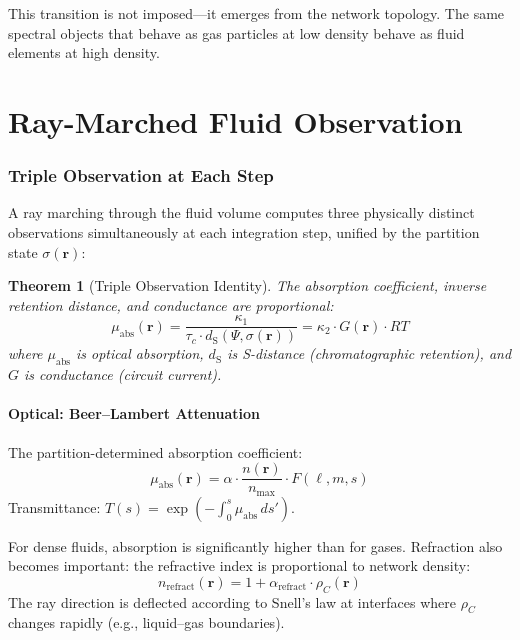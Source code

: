 \documentclass[twocolumn,10pt,a4paper]{article}
\theoremstyle{plain}
\newtheorem{theorem}{Theorem}[section]
\theoremstyle{definition}
\theoremstyle{remark}
\newcommand{\tauc}{\tau_c}
\newcommand{\dS}{d_{\mathrm{S}}}
\begin{document}
This transition is not imposed---it emerges from the network topology. The same spectral objects that behave as gas particles at low density behave as fluid elements at high density.


\part{Ray-Marched Fluid Observation}
\label{part:ray_march}

\section{Triple Observation at Each Step}
\label{sec:triple_obs}

A ray marching through the fluid volume computes three physically distinct observations simultaneously at each integration step, unified by the partition state $\sigma(\mathbf{r})$:

\begin{theorem}[Triple Observation Identity]
\label{thm:triple_obs}
The absorption coefficient, inverse retention distance, and conductance are proportional:
\begin{equation}
\boxed{\mu_{\mathrm{abs}}(\mathbf{r}) = \frac{\kappa_1}{\tauc \cdot \dS(\Psi, \sigma(\mathbf{r}))} = \kappa_2 \cdot G(\mathbf{r}) \cdot RT}
\end{equation}
where $\mu_{\mathrm{abs}}$ is optical absorption, $\dS$ is S-distance (chromatographic retention), and $G$ is conductance (circuit current).
\end{theorem}

\subsection{Optical: Beer--Lambert Attenuation}

The partition-determined absorption coefficient:
\begin{equation}
    \mu_{\mathrm{abs}}(\mathbf{r}) = \alpha \cdot \frac{n(\mathbf{r})}{n_{\max}} \cdot F(\ell, m, s)
\end{equation}
Transmittance: $T(s) = \exp(-\int_0^s \mu_{\mathrm{abs}}\, ds')$.

For dense fluids, absorption is significantly higher than for gases. Refraction also becomes important: the refractive index is proportional to network density:
\begin{equation}
    n_{\mathrm{refract}}(\mathbf{r}) = 1 + \alpha_{\mathrm{refract}} \cdot \rho_C(\mathbf{r})
\end{equation}
The ray direction is deflected according to Snell's law at interfaces where $\rho_C$ changes rapidly (e.g., liquid--gas boundaries).
\end{document}

